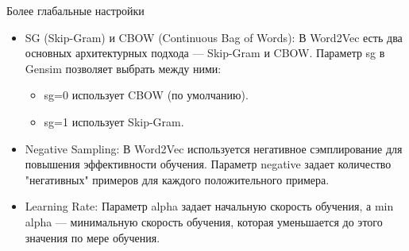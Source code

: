 			Более глабальные настройки
			\begin{itemize}
				\item SG (Skip-Gram) и CBOW (Continuous Bag of Words): В Word2Vec есть два основных архитектурных подхода — Skip-Gram и CBOW. Параметр sg в Gensim позволяет выбрать между ними:
					\begin{itemize}
						\item sg=0 использует CBOW (по умолчанию).
						\item sg=1 использует Skip-Gram.
					\end{itemize}
				\item Negative Sampling: В Word2Vec используется негативное сэмплирование для повышения эффективности обучения. Параметр negative задает количество "негативных" примеров для каждого положительного примера.
				\item Learning Rate: Параметр alpha задает начальную скорость обучения, а min alpha — минимальную скорость обучения, которая уменьшается до этого значения по мере обучения.
			\end{itemize}
		
